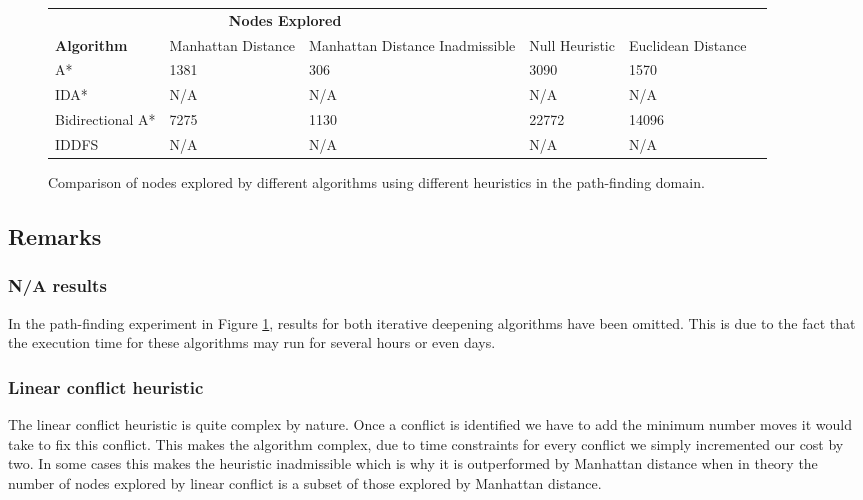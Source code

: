 \documentclass{article}
\begin{document}
\begin{figure}[]
    \centering
    \hspace*{-2cm}
\begin{tabular}{@{}lllllr@{}} \toprule
\multicolumn{3}{c}{\textbf{Nodes Explored}} \\ \cmidrule(r){2-5}
\textbf{Algorithm}& Manhattan Distance & Manhattan Distance Inadmissible & Null Heuristic & Euclidean Distance \\ \midrule
A*               & 1381               & 306                             & 3090           & 1570               \\
IDA*             & N/A                & N/A                             & N/A            & N/A                \\
Bidirectional A* & 7275               & 1130                            & 22772          & 14096              \\
IDDFS            & N/A                & N/A                             & N/A            & N/A                
\end{tabular}
    \caption{Comparison of nodes explored by different algorithms using different heuristics in the path-finding domain.}
    \label{table:Pathfinder_comparison_nodes}
\end{figure}

\subsection{Remarks}

\subsubsection{N/A results}
In the path-finding experiment in Figure \ref{table:Pathfinder_comparison_nodes}, results for both iterative deepening algorithms have been omitted. This is due to the fact that the execution time for these algorithms may run for several hours or even days.

\subsubsection{Linear conflict heuristic}
The linear conflict heuristic is quite complex by nature. Once a conflict is identified we have to add the minimum number moves it would take to fix this conflict. This makes the algorithm complex, due to time constraints for every conflict we simply incremented our cost by two. In some cases this makes the heuristic inadmissible which is why it is outperformed by Manhattan distance when in theory the number of nodes explored by linear conflict is a subset of those explored by Manhattan distance.
\end{document}
